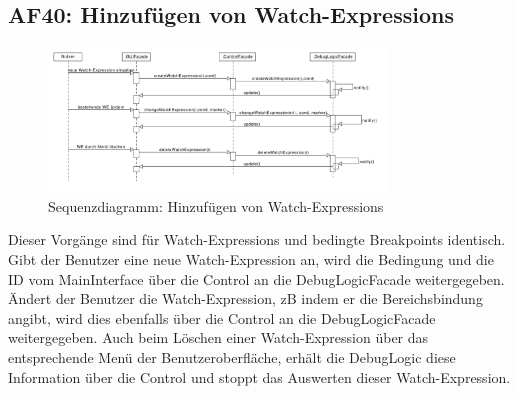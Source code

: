 \documentclass[parskip=full]{scrartcl}
\begin{document}
\subsection{AF40: Hinzufügen von Watch-Expressions}
\begin{figure}[!h]
\centering
\includegraphics[width=0.8\textwidth]{diagrammIdeenUmlet/SequenceDiagrams/seq_WatchExpressionsPDF.pdf}
\caption{Sequenzdiagramm: Hinzufügen von Watch-Expressions}
\end{figure}
Dieser Vorgänge sind für Watch-Expressions und bedingte Breakpoints identisch. \\
Gibt der Benutzer eine neue Watch-Expression an, wird die Bedingung und die ID vom MainInterface über 
die Control an die DebugLogicFacade weitergegeben. Ändert der Benutzer die Watch-Expression, zB indem 
er die Bereichsbindung angibt, wird dies ebenfalls über die Control an die DebugLogicFacade weitergegeben.
Auch beim Löschen einer Watch-Expression über das entsprechende Menü der Benutzeroberfläche, erhält die
DebugLogic diese Information über die Control und stoppt das Auswerten dieser Watch-Expression.

\newpage
\end{document}
